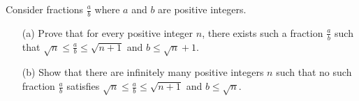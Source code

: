 Consider fractions 
$\frac{a}{b}$
 where 
$a$
 and 
$b$
 are positive integers.

\begin{itemize}
	\item[(a)] Prove that for every positive integer 
	$n$, 
	 there exists such a fraction 
	$\frac{a}{b}$
	 such that 
	$\sqrt{n} \le \frac{a}{b} \le \sqrt{n+1}$
	 and 
	$b \le \sqrt{n}+1$. 


	\item[(b)] Show that there are infinitely many positive integers 
	$n$
	 such that no such fraction 
	$\frac{a}{b}$
	 satisfies 
	$\sqrt{n} \le \frac{a}{b} \le \sqrt{n+1}$
	 and 
	$b \le \sqrt{n}$. 
\end{itemize}